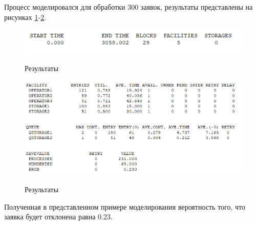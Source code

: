 Процесс моделировался для обработки 300 заявок, результаты представлены на рисунках \ref{fig5:image}-\ref{fig6:image}.

\begin{figure}[h]
	\begin{center}
		{\includegraphics[scale = 0.8]{img/res1.png}}
		\caption{Результаты}
		\label{fig5:image}
	\end{center}
\end{figure}

\begin{figure}[h]
	\begin{center}
		{\includegraphics[scale = 0.8]{img/res2.png}}
		\caption{Результаты}
		\label{fig6:image}
	\end{center}
\end{figure}

Полученная в представленном примере моделирования вероятность того, что заявка будет отклонена равна 0.23.